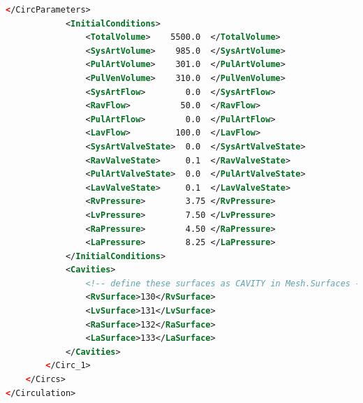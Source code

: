 \begin{lstlisting}[language=XML,caption=.xml settings for the 4-chamber circulation model]
            </CircParameters>
            <InitialConditions>
                <TotalVolume>    5500.0  </TotalVolume>
                <SysArtVolume>    985.0  </SysArtVolume>
                <PulArtVolume>    301.0  </PulArtVolume>
                <PulVenVolume>    310.0  </PulVenVolume>
                <SysArtFlow>        0.0  </SysArtFlow>
                <RavFlow>          50.0  </RavFlow>
                <PulArtFlow>        0.0  </PulArtFlow>
                <LavFlow>         100.0  </LavFlow>
                <SysArtValveState>  0.0  </SysArtValveState>
                <RavValveState>     0.1  </RavValveState>
                <PulArtValveState>  0.0  </PulArtValveState>
                <LavValveState>     0.1  </LavValveState>
                <RvPressure>        3.75 </RvPressure>
                <LvPressure>        7.50 </LvPressure>
                <RaPressure>        4.50 </RaPressure>
                <LaPressure>        8.25 </LaPressure>
            </InitialConditions>
            <Cavities>
                <!-- define these surfaces as CAVITY in Mesh.Surfaces -->
                <RvSurface>130</RvSurface>
                <LvSurface>131</LvSurface>
                <RaSurface>132</RaSurface>
                <LaSurface>133</LaSurface>
            </Cavities>
        </Circ_1>
    </Circs>
</Circulation>
\end{lstlisting}

